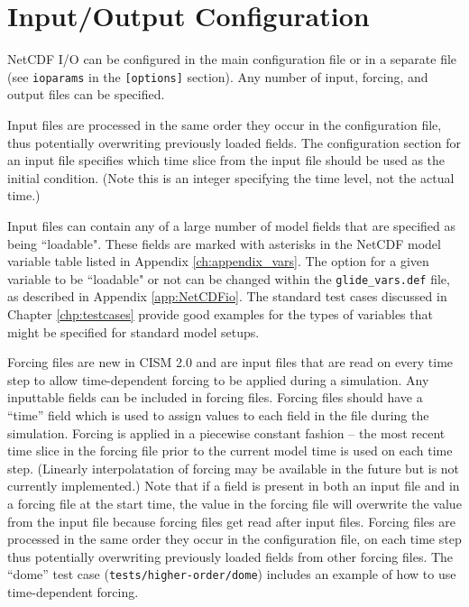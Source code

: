 \section{Input/Output Configuration}

NetCDF I/O can be configured in the main configuration file or in a separate file 
(see \texttt{ioparams} in the \texttt{[options]} section). 
Any number of input, forcing, and output files can be specified. 

Input files are processed in the same order they occur in the configuration file, 
thus potentially overwriting previously loaded fields.  The configuration section 
for an input file specifies which time slice from the input file should be used as
the initial condition.  (Note this is an integer specifying the time level, not
the actual time.)

Input files can contain any of a large number of model fields that are specified as being
``loadable". These fields are marked with asterisks in the NetCDF model variable
table listed in Appendix \ref{ch:appendix_vars}. The option for a given variable to be ``loadable" 
or not can be changed within the \texttt{glide\_vars.def} file, as described in Appendix \ref{app:NetCDFio}. 
The standard test cases discussed in Chapter \ref{chp:testcases} provide good examples for the types 
of variables that might be specified for standard model setups.    

Forcing files are new in CISM 2.0 and are input files that are read on every 
time step to allow time-dependent
forcing to be applied during a simulation.  Any inputtable fields can be included
in forcing files.  Forcing files should have a ``time'' field which is used to 
assign values to each field in the file during the simulation.  Forcing is applied 
in a piecewise constant fashion -- the most recent time slice in the forcing file prior
to the current model time is used on each time step.  (Linearly interpolatation of
forcing may be available in the future but is not currently implemented.)
Note that if a field is present in both an input file and in a
forcing file at the start time, the value in the forcing file will overwrite the value
from the input file because forcing files get read after input files.
Forcing files are processed in the same order they occur in the configuration file, 
on each time step thus potentially overwriting previously loaded fields from other
forcing files.  The ``dome'' test case (\texttt{tests/higher-order/dome}) includes 
an example of how to use time-dependent forcing.


